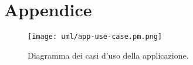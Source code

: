 \section{Appendice}

\begin{figure}[H]
    \centering
    \texttt{[image: uml/app-use-case.pm.png]}
    \caption{Diagramma dei casi d'uso della applicazione.}
    \label{fig:app-use-case}
\end{figure}


